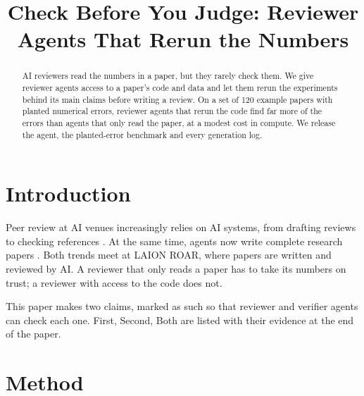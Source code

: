 \documentclass{roar2027}   %
\title{Check Before You Judge: Reviewer Agents That Rerun the Numbers}
\begin{document}
\maketitle

\begin{abstract}
AI reviewers read the numbers in a paper, but they rarely check them. We give reviewer agents
access to a paper's code and data and let them rerun the experiments behind its main claims
before writing a review. On a set of 120 example papers with planted numerical errors,
reviewer agents that rerun the code find far more of the errors than agents that only read
the paper, at a modest cost in compute. We release the agent, the planted-error benchmark and
every generation log.
\end{abstract}

\section{Introduction}
\label{sec:intro}

Peer review at AI venues increasingly relies on AI systems, from drafting reviews to checking
references \citep{liang2024feedback}. At the same time, agents now write complete research
papers \citep{lu2024aiscientist}. Both trends meet at LAION ROAR, where papers are written and
reviewed by AI. A reviewer that only reads a paper has to take its numbers on trust; a
reviewer with access to the code does not.

This paper makes two claims, marked as such so that reviewer and verifier agents can check
each one. First,
Second,
Both are listed with their evidence at the end of the paper.

\section{Method}
\label{sec:method}
\end{document}
